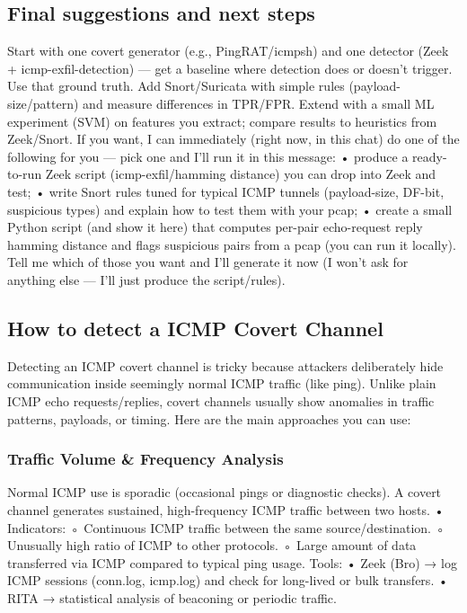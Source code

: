 \subsection{Final suggestions and next steps} 
Start with one covert generator (e.g., PingRAT/icmpsh) and one detector (Zeek + icmp-exfil-detection) — 
get a baseline where detection does or doesn’t trigger. Use that ground truth. 
Add Snort/Suricata with simple rules (payload-size/pattern) and measure differences in TPR/FPR.
Extend with a small ML experiment (SVM) on features you extract; compare results to heuristics from Zeek/Snort.
%
%
If you want, I can immediately (right now, in this chat) do one of the following for you — pick one and I’ll run it in this message:
    • produce a ready-to-run Zeek script (icmp-exfil/hamming distance) you can drop into Zeek and test;
    • write Snort rules tuned for typical ICMP tunnels (payload-size, DF-bit, suspicious types) and explain how to test them with your pcap;
    • create a small Python script (and show it here) that computes per-pair echo-request reply hamming distance and flags suspicious pairs from a pcap (you can run it locally).
Tell me which of those you want and I’ll generate it now (I won’t ask for anything else — I’ll just produce the script/rules).

\subsection{How to detect a ICMP Covert Channel} 
Detecting an ICMP covert channel is tricky because attackers deliberately hide communication inside seemingly normal ICMP traffic (like ping).
Unlike plain ICMP echo requests/replies, covert channels usually show anomalies in traffic patterns, payloads, or timing.
%
Here are the main approaches you can use:
\subsubsection{Traffic Volume \& Frequency Analysis}
Normal ICMP use is sporadic (occasional pings or diagnostic checks).
A covert channel generates sustained, high-frequency ICMP traffic between two hosts. 
    • Indicators:
    ◦ Continuous ICMP traffic between the same source/destination.
    ◦ Unusually high ratio of ICMP to other protocols.
    ◦ Large amount of data transferred via ICMP compared to typical ping usage. 
Tools:
    • Zeek (Bro) → log ICMP sessions (conn.log, icmp.log) and check for long-lived or bulk transfers.
    • RITA → statistical analysis of beaconing or periodic traffic.


